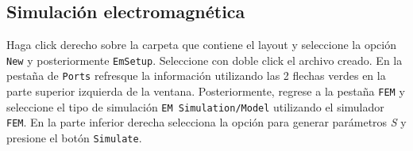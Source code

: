 \subsection{Simulación electromagnética}

Haga click derecho sobre la carpeta que contiene el layout y seleccione la opción \texttt{New} y posteriormente \texttt{EmSetup}. Seleccione con doble click el archivo creado.
En la pestaña de \texttt{Ports} refresque la información utilizando las 2 flechas verdes en la parte superior izquierda de la ventana. Posteriormente, regrese a la pestaña \texttt{FEM} y seleccione el tipo de simulación \texttt{EM Simulation/Model} utilizando el simulador \texttt{FEM}. En la parte inferior derecha selecciona la opción para generar parámetros \textit{S} y presione el botón \texttt{Simulate}.
